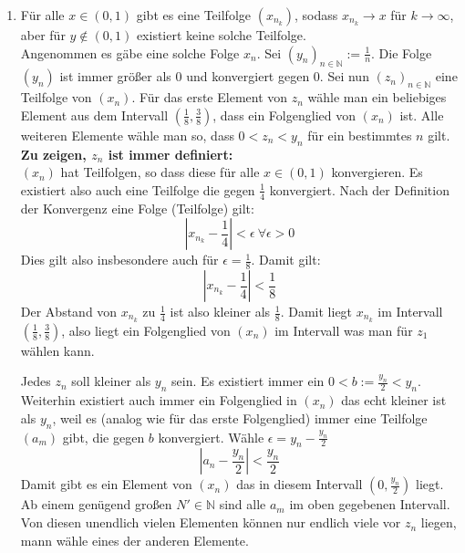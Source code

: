 \documentclass[11pt]{article}
\begin{document}
\begin{enumerate}[ label = (\roman*)]
            \item Für alle \( x \in (0, 1) \) gibt es eine Teilfolge \( (x_{n_k}) \), sodass \(x_{n_k} \to x\) für \( k \to \infty \), aber für \(y \notin (0, 1)\) existiert keine solche Teilfolge. \\
            Angenommen es gäbe eine solche Folge \(x_n\).
            Sei \( {(y_n)}_{n \in \mathbb{N}} := \frac{1}{n} \). Die Folge \( (y_n) \) ist immer größer als 0 und konvergiert gegen 0.
            Sei nun \( {(z_n)}_{n \in \mathbb{N}} \) eine Teilfolge von \((x_n)\).
            Für das erste Element von \(z_n\) wähle man ein beliebiges Element aus dem Intervall \( (\frac{1}{8}, \frac{3}{8}) \), dass ein Folgenglied von \((x_n)\) ist. 
            Alle weiteren Elemente wähle man so, dass \(0 < z_n < y_n\) für ein bestimmtes \(n\) gilt. \\
            \textbf{Zu zeigen, \(z_n\) ist immer definiert:} \\
            \((x_n)\) hat Teilfolgen, so dass diese für alle \(x \in (0, 1)\) konvergieren. Es existiert also auch eine Teilfolge die gegen \(\frac{1}{4}\) konvergiert.
            Nach der Definition der Konvergenz eine Folge (Teilfolge) gilt:
            \[ | x_{n_k} - \frac{1}{4} | < \epsilon \ \forall \epsilon > 0 \]
            Dies gilt also insbesondere auch für \(\epsilon = \frac{1}{8}\). Damit gilt:
            \[ | x_{n_k} - \frac{1}{4} | < \frac{1}{8} \]
            Der Abstand von \(x_{n_k}\) zu \(\frac{1}{4}\) ist also kleiner als \(\frac{1}{8}\). Damit liegt \(x_{n_k}\) im Intervall \( (\frac{1}{8}, \frac{3}{8}) \),
            also liegt ein Folgenglied von \((x_n)\) im Intervall was man für \(z_1\) wählen kann.

            Jedes \(z_n\) soll kleiner als \(y_n\) sein.
            Es existiert immer ein \( 0 < b:= \frac{y_{n}}{2} < y_{n}\).
            Weiterhin existiert auch immer ein Folgenglied in \((x_n)\) das echt kleiner ist als \(y_{n}\),
            weil es (analog wie für das erste Folgenglied) immer eine Teilfolge \((a_{m})\) gibt, die gegen \(b\) konvergiert.
            Wähle \( \epsilon = y_{n} - \frac{y_{n}}{2} \)
            \[ |a_{n} - \frac{y_{n}}{2} | < \frac{y_{n}}{2} \]
            Damit gibt es ein Element von \((x_n)\) das in diesem Intervall \((0, \frac{y_{n}}{2})\) liegt.
            Ab einem genügend großen \(N' \in \mathbb{N}\) sind alle \(a_m\) im oben gegebenen Intervall.
            Von diesen unendlich vielen Elementen können nur endlich viele vor \(z_n\) liegen, mann wähle eines der anderen Elemente.
            

\end{enumerate}
\end{document}
